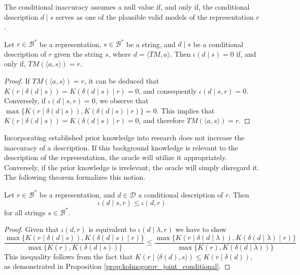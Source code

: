 The conditional inaccuracy assumes a null value if, and only if, the conditional description $d \mid s$ serves as one of the plausible valid models of the representation $r$.

\begin{proposition}\label{prop:perfect_description}
Let $r \in \mathcal{B}^\ast$ be a representation, $s \in \mathcal{B}^\ast$ be a string, and $d \mid s$ be a conditional description of $r$ given the string $s$, where $d = \langle TM, a \rangle$. Then $\iota(d \mid s) = 0$ if, and only if, $TM \left(\langle a, s \rangle \right) = r$.
\end{proposition}
\begin{proof}
If $TM \left(\langle a, s \rangle \right) = r$, it can be deduced that $K \left( r \mid \delta(d \mid s) \right) = K \left( \delta(d \mid s) \mid r \right) = 0$, and consequently $\iota(d \mid s, r) = 0$. Conversely, if $\iota(d \mid s, r) = 0$, we observe that $\max\{ K \left( r \mid \delta(d \mid s) \right), K \left( \delta(d \mid s) \mid r \right) \} = 0$. This implies that $K \left( r \mid \delta(d \mid s) \right) = K \left( \delta(d \mid s) \mid r \right) = 0$, and therefore $TM \left(\langle a, s \rangle \right) = r$.
\end{proof}

Incorporating established prior knowledge into research does not increase the inaccuracy of a description. If this background knowledge is relevant to the description of the representation, the oracle will utilize it appropriately. Conversely, if the prior knowledge is irrelevant, the oracle will simply disregard it. The following theorem formalizes this notion.

\begin{theorem}
\label{th:conditional_inaccuracy}
Let $r \in \mathcal{B}^\ast$ be a representation, and $d \in \mathcal{D}$ a conditional description of $r$. Then
\[
\iota(d \mid s, r) \leq \iota(d , r)
\]
for all strings $s \in \mathcal{B}^\ast$.
\end{theorem}
\begin{proof}
Given that $\iota(d , r)$ is equivalent to $\iota(d \mid \lambda, r)$ we have to show 
\[
\frac{ \max\{ K \left(r \mid \delta(d \mid s) \right), K \left( \delta(d \mid s) \mid r \right) \} } { \max\{ K(r), K \left( \delta(d \mid s) \right) \} } \leq \frac{ \max\{ K \left(r \mid \delta(d \mid \lambda ) \right), K \left( \delta(d \mid \lambda ) \mid r \right) \} } { \max\{ K(r), K \left( \delta(d \mid \lambda ) \right) \} }
\]
This inequality follows from the fact that $K \left(r \mid \langle \delta(d), s \rangle \right) \leq  K \left(r \mid \delta(d) \right)$, as demonstrated in Proposition \ref{prop:kolmogorov_joint_conditional}.
\end{proof}

